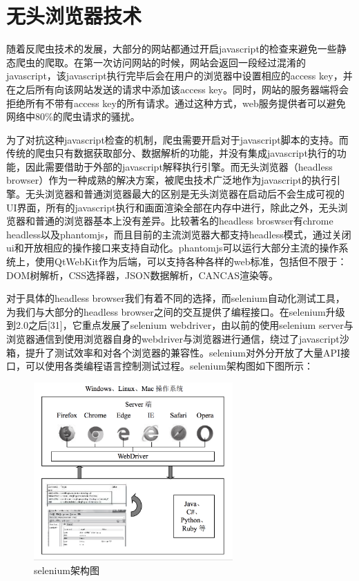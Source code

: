\documentclass[doctor,privacy,twoside]{buaa_mac}
\begin{document}
\section{无头浏览器技术}
随着反爬虫技术的发展，大部分的网站都通过开启javascript的检查来避免一些静态爬虫的爬取。在第一次访问网站的时候，网站会返回一段经过混淆的javascript，该javascript执行完毕后会在用户的浏览器中设置相应的access key，并在之后所有向该网站发送的请求中添加该access key。同时，网站的服务器端将会拒绝所有不带有access key的所有请求。通过这种方式，web服务提供者可以避免网络中80\%的爬虫请求的骚扰。

为了对抗这种javascript检查的机制，爬虫需要开启对于javascript脚本的支持。而传统的爬虫只有数据获取部分、数据解析的功能，并没有集成javascript执行的功能，因此需要借助于外部的javascript解释执行引擎。而无头浏览器（headless browser）作为一种成熟的解决方案，被爬虫技术广泛地作为javascript的执行引擎。无头浏览器和普通浏览器最大的区别是无头浏览器在启动后不会生成可视的UI界面，所有的javascript执行和画面渲染全部在内存中进行，除此之外，无头浏览器和普通的浏览器基本上没有差异。比较著名的headless broswser有chrome headless以及phantomjs，而且目前的主流浏览器大都支持headless模式，通过关闭ui和开放相应的操作接口来支持自动化。phantomjs可以运行大部分主流的操作系统上，使用QtWebKit作为后端，可以支持各种各样的web标准，包括但不限于：DOM树解析，CSS选择器，JSON数据解析，CANCAS渲染等。

对于具体的headless browser我们有着不同的选择，而selenium自动化测试工具，为我们与大部分的headless browser之间的交互提供了编程接口。在selenium升级到2.0之后[31]，它重点发展了selenium webdriver，由以前的使用selenium server与浏览器通信到使用浏览器自身的webdriver与浏览器进行通信，绕过了javascript沙箱，提升了测试效率和对各个浏览器的兼容性。selenium对外分开放了大量API接口，可以使用各类编程语言控制测试过程。selenium架构图如下图所示：


\centerline{}
\begin{figure}[!h]
  \centering
  \includegraphics[width=0.68\textwidth]{images/selenium.png}
  \caption{selenium架构图}
  \label{fig:logo}
\end{figure}
\centerline{}
\end{document}
